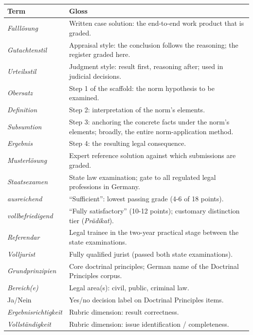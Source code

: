 \begin{table}[t]
\centering
\footnotesize
\setlength{\tabcolsep}{5pt}
\begin{tabular}{@{}p{}p{}@{}}
\toprule
\textbf{Term} & \textbf{Gloss} \\
\midrule
\emph{Falllösung} & Written case solution: the end-to-end work product that is graded. \\
\emph{Gutachtenstil} & Appraisal style: the conclusion follows the reasoning; the register graded here. \\
\emph{Urteilsstil} & Judgment style: result first, reasoning after; used in judicial decisions. \\
\emph{Obersatz} & Step 1 of the scaffold: the norm hypothesis to be examined. \\
\emph{Definition} & Step 2: interpretation of the norm's elements. \\
\emph{Subsumtion} & Step 3: anchoring the concrete facts under the norm's elements; broadly, the entire norm-application method. \\
\emph{Ergebnis} & Step 4: the resulting legal consequence. \\
\emph{Musterlösung} & Expert reference solution against which submissions are graded. \\
\emph{Staatsexamen} & State law examination; gate to all regulated legal professions in Germany. \\
\emph{ausreichend} & ``Sufficient'': lowest passing grade (4-6 of 18 points). \\
\emph{vollbefriedigend} & ``Fully satisfactory'' (10-12 points); customary distinction tier (\emph{Prädikat}). \\
\emph{Referendar} & Legal trainee in the two-year practical stage between the state examinations. \\
\emph{Volljurist} & Fully qualified jurist (passed both state examinations). \\
\emph{Grundprinzipien} & Core doctrinal principles; German name of the Doctrinal Principles corpus. \\
\emph{Bereich(e)} & Legal area(s): civil, public, criminal law. \\
Ja/Nein & Yes/no decision label on Doctrinal Principles items. \\
\emph{Ergebnisrichtigkeit} & Rubric dimension: result correctness. \\
\emph{Vollständigkeit} & Rubric dimension: issue identification / completeness. \\

\end{tabular}
\end{table}
